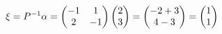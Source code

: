 \documentclass[preview]{standalone}
\begin{document}
\begin{align*}
\special{dvisvgm:raw <g id='unique000'>}\xi=P^{-1}\alpha=\begin{pmatrix}-1&1\\2&-1\end{pmatrix}\begin{pmatrix}2\\3\end{pmatrix}=\begin{pmatrix}-2+3\\4-3\end{pmatrix}=\begin{pmatrix}1\\1\end{pmatrix}\special{dvisvgm:raw </g>}
\end{align*}
\end{document}
